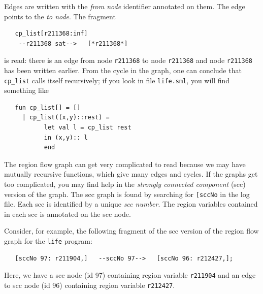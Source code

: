 \documentclass[12pt]{book}
\begin{document}
Edges are written with the {\em from node\/} identifier annotated on
them. The edge points to the \emph{to node}. The fragment
\begin{verbatim}
   cp_list[r211368:inf]
    --r211368 sat-->   [*r211368*]
\end{verbatim}
is read: there is an edge from node \texttt{r211368} to node
\texttt{r211368} and node \texttt{r211368} has been written earlier. From
the cycle in the graph, one can conclude that \texttt{cp\_list} calls
itself recursively; if you look in file {\tt life.sml}, you will
find something like
\begin{verbatim}
   fun cp_list[] = []
     | cp_list((x,y)::rest) = 
           let val l = cp_list rest
           in (x,y):: l
           end
\end{verbatim}


The region flow graph can get very complicated to read because we may have
mutually recursive functions, which give many edges and cycles.  If the
graphs get too complicated, you may find help in the 
%
{\em strongly connected component\/} (scc) version of the graph.  The
scc graph is found by searching for \texttt{[sccNo} in the log file.
Each scc is identified by a unique {\em scc number}. The region
variables contained in each scc is annotated on the scc node.

Consider, for example, the following fragment of the scc version of
the region flow graph for the {\tt life} program:
\begin{verbatim}
   [sccNo 97: r211904,]   --sccNo 97-->   [sccNo 96: r212427,];
\end{verbatim}
Here, we have a scc node (id 97) containing region variable
\texttt{r211904} and an edge to scc node (id 96) containing region
variable \texttt{r212427}.
\end{document}
